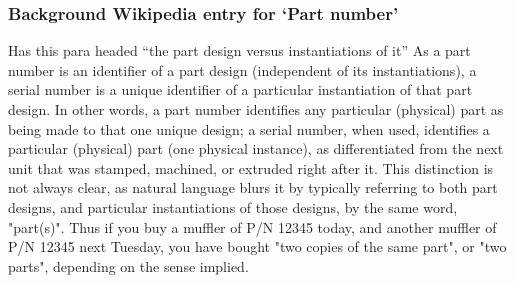 \subsubsection{Background Wikipedia entry for `Part number'}
Has this para headed ``the part design versus instantiations of it''
As a part number is an identifier of a part design (independent of its instantiations), a serial number is a unique identifier of a particular instantiation of that part design. In other words, a part number identifies any particular (physical) part as being made to that one unique design; a serial number, when used, identifies a particular (physical) part (one physical instance), as differentiated from the next unit that was stamped, machined, or extruded right after it. This distinction is not always clear, as natural language blurs it by typically referring to both part designs, and particular instantiations of those designs, by the same word, "part(s)". Thus if you buy a muffler of P/N 12345 today, and another muffler of P/N 12345 next Tuesday, you have bought "two copies of the same part", or "two parts", depending on the sense implied.


